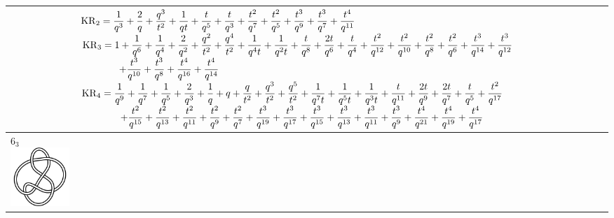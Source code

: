 \documentclass{compositio}
\theoremstyle{definition}
\numberwithin{equation}{section}
\begin{document}
{\begin{longtable}{p{}|p{}}
& 
$
\displaystyle{%
\KR_{2} = \frac{1}{q^3}+\frac{2}{q}+\frac{q^3}{t^2}+\frac{1}{q t}+\frac{t}{q^5}+\frac{t}{q^3}+\frac{t^2}{q^7}+\frac{t^2}{q^5}+\frac{t^3}{q^9}+\frac{t^3}{q^7}+\frac{t^4}{q^{11}}
}
$
\newline 
$
\displaystyle{%
\KR_{3} = 1+\frac{1}{q^6}+\frac{1}{q^4}+\frac{2}{q^2}+\frac{q^2}{t^2}+\frac{q^4}{t^2}+\frac{1}{q^4 t}+\frac{1}{q^2 t}+\frac{t}{q^8}+\frac{2 t}{q^6}+\frac{t}{q^4}+\frac{t^2}{q^{12}}+\frac{t^2}{q^{10}}+\frac{t^2}{q^8}+\frac{t^2}{q^6}+\frac{t^3}{q^{14}}+\frac{t^3}{q^{12}}
}
$
\newline
$
\displaystyle{%
\qquad\qquad +\frac{t^3}{q^{10}}+\frac{t^3}{q^8}+\frac{t^4}{q^{16}}+\frac{t^4}{q^{14}}
}
$
\newline 
$
\displaystyle{%
\KR_{4} = \frac{1}{q^9}+\frac{1}{q^7}+\frac{1}{q^5}+\frac{2}{q^3}+\frac{1}{q}+q+\frac{q}{t^2}+\frac{q^3}{t^2}+\frac{q^5}{t^2}+\frac{1}{q^7 t}+\frac{1}{q^5 t}+\frac{1}{q^3 t}+\frac{t}{q^{11}}+\frac{2 t}{q^9}+\frac{2 t}{q^7}+\frac{t}{q^5}+\frac{t^2}{q^{17}}
}
$
\newline
$
\displaystyle{%
\qquad\qquad +\frac{t^2}{q^{15}}+\frac{t^2}{q^{13}}+\frac{t^2}{q^{11}}+\frac{t^2}{q^9}+\frac{t^2}{q^7}+\frac{t^3}{q^{19}}+\frac{t^3}{q^{17}}+\frac{t^3}{q^{15}}+\frac{t^3}{q^{13}}+\frac{t^3}{q^{11}}+\frac{t^3}{q^9}+\frac{t^4}{q^{21}}+\frac{t^4}{q^{19}}+\frac{t^4}{q^{17}}
}
$
\\
\hline
$6_{3}$ 
\includegraphics[scale=0.07,angle=0]{knot6_3.pdf} 

\end{longtable}}
\end{document}
